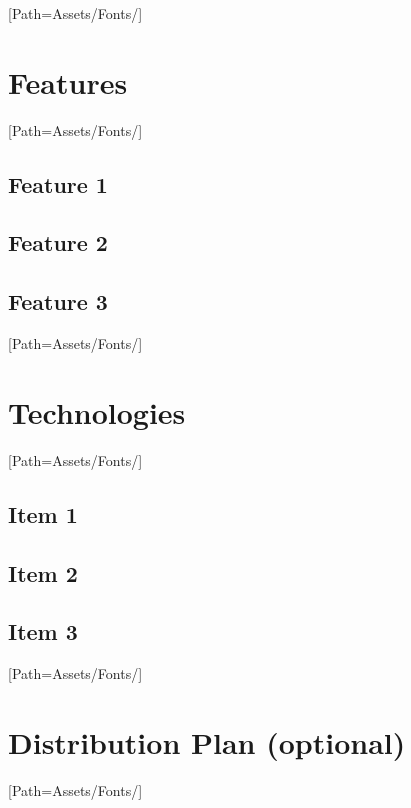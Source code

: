 \documentclass{article}
\begin{document}
\setmainfont{LEMONMILK-Bold.otf}[Path=Assets/Fonts/]
\section{Features}
    \setmainfont{LEMONMILK-Regular.otf}[Path=Assets/Fonts/]
    \subsection{Feature 1}
        \lipsum[2-4]
    \subsection{Feature 2}
        \lipsum[2-4]
    \subsection{Feature 3}
        \lipsum[2-4]
\newpage

\setmainfont{LEMONMILK-Bold.otf}[Path=Assets/Fonts/]
\section{Technologies}
    \setmainfont{LEMONMILK-Regular.otf}[Path=Assets/Fonts/]
    \subsection{Item 1}
        \lipsum[2-4]
    \subsection{Item 2}
        \lipsum[2-4]
    \subsection{Item 3}
        \lipsum[2-4]
\newpage

\setmainfont{LEMONMILK-Bold.otf}[Path=Assets/Fonts/]
\section{Distribution Plan (optional)}
    \setmainfont{LEMONMILK-Regular.otf}[Path=Assets/Fonts/]
    \lipsum[2-4]
\newpage

\end{document}

